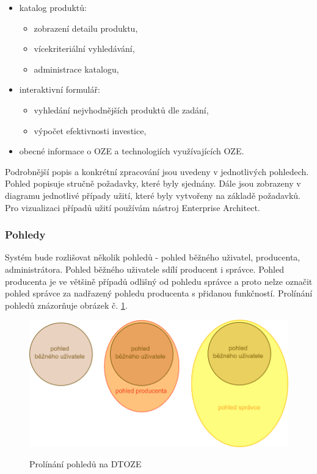 \documentclass[11pt,a4paper]{article}
\begin{document}
\begin{itemize}
\item katalog produktů:
\begin{itemize}
\item zobrazení detailu produktu,
\item vícekriteriální vyhledávání,
\item administrace katalogu,
\end{itemize}
\item interaktivní formulář:
\begin{itemize}
\item vyhledání nejvhodnějších produktů dle zadání,
\item výpočet efektivnosti investice,
\end{itemize}
\item obecné informace o OZE a technologiích využívajících OZE.
\end{itemize}

Podrobnější popis a konkrétní zpracování jsou uvedeny v jednotlivých pohledech. Pohled popisuje stručně požadavky, které byly sjednány. Dále jsou zobrazeny v diagramu jednotlivé případy užití, které byly vytvořeny na základě požadavků. Pro vizualizaci případů užití používám nástroj Enterprise Architect.    

\subsubsection{Pohledy}
Systém bude rozlišovat několik pohledů - pohled běžného uživatel, producenta, administrátora. Pohled běžného uživatele sdílí producent i správce. Pohled producenta je ve většině případů odlišný od pohledu správce a proto nelze označit pohled správce za nadřazený pohledu producenta s přidanou funkčností. Prolínání pohledů znázorňuje obrázek č. \ref{fig:pohledy}.

\begin{figure}[H] 
\centering 
\caption{Prolínání pohledů na DTOZE} 
\vspace{0.1cm}
\includegraphics[scale=0.4]{vize_DTOZE_pohledy1} 
\label{fig:pohledy}
\end{figure} 
\end{document}

